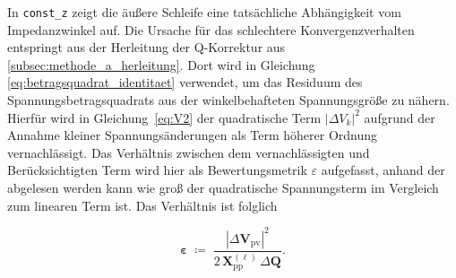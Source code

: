 In \texttt{const\_z} zeigt die äußere Schleife eine tatsächliche Abhängigkeit vom Impedanzwinkel auf. 
Die Ursache für das schlechtere Konvergenzverhalten entspringt aus der Herleitung der Q-Korrektur aus \cref{subsec:methode_a_herleitung}. 
Dort wird in Gleichung \eqref{eq:betragsquadrat_identitaet} verwendet, um das Residuum des Spannungsbetragsquadrats aus der winkelbehafteten Spannungsgröße zu nähern.
Hierfür wird in Gleichung~\eqref{eq:V2} der quadratische Term $|\Delta V_k|^2$ aufgrund der Annahme kleiner Spannungsänderungen als Term höherer Ordnung vernachlässigt.
%
%
Das Verhältnis zwischen dem vernachlässigten und Berücksichtigten Term wird hier als Bewertungsmetrik $\varepsilon$ aufgefasst, anhand der abgelesen werden kann wie groß der quadratische Spannungsterm im Vergleich zum linearen Term ist.
Das Verhältnis ist folglich 

\begin{equation}
	\mathbf{\varepsilon}
	\;\coloneqq\; \frac{|\Delta\mathbf{V}_\mathrm{pv}|^2}{2\,\mathbf{X}_\mathrm{pp}^{(\ell)}\,\Delta\mathbf{Q}}.
	\label{eq:eps-coupled-step1c}
\end{equation}

